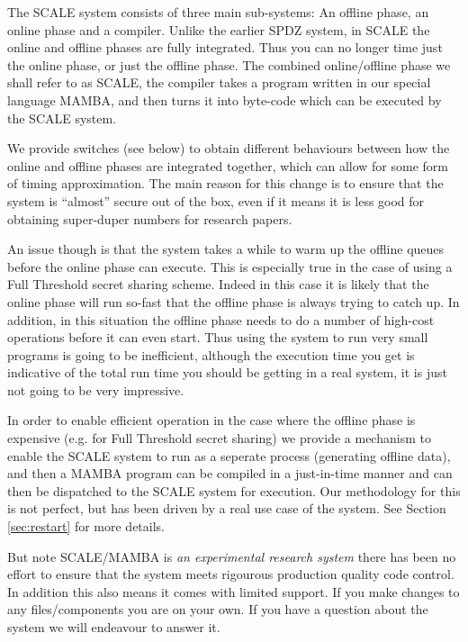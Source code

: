 

\label{sec:introduction}
The SCALE system consists of three main sub-systems:
An offline phase, an online phase and a compiler. 
Unlike the earlier SPDZ system, in SCALE the online
and offline phases are fully integrated. Thus you
can no longer time just the online phase, or just
the offline phase.
The combined online/offline phase we shall refer
to as SCALE, the compiler takes a program written
in our special language MAMBA, and then turns it
into byte-code which can be executed by the SCALE
system. 

We provide switches (see below) to obtain 
different behaviours between how the online and offline
phases are integrated together, which can allow for
some form of timing approximation.
The main reason for this change is to ensure that the
system is ``almost'' secure out of the box, even if it
means it is less good for obtaining super-duper numbers
for research papers.

An issue though is that the system takes a while to warm
up the offline queues before the online phase can execute.
This is especially true in the case of using a Full Threshold
secret sharing scheme. Indeed in this case it is likely
that the online phase will run so-fast that the offline
phase is always trying to catch up. In addition, in this
situation the offline phase needs to do a number of
high-cost operations before it can even start. Thus
using the system to run very small programs is going to
be inefficient, although the execution time you get
is indicative of the total run time you should be getting
in a real system, it is just not going to be very
impressive.

In order to enable efficient operation in the case where the
offline phase is expensive (e.g. for Full Threshold secret sharing)
we provide a mechanism to enable the SCALE system to run
as a seperate process (generating offline data), and then
a MAMBA program can be compiled in a just-in-time manner
and can then be dispatched to the SCALE system for
execution. Our methodology for this is not perfect, but has
been driven by a real use case of the system.
See Section \ref{sec:restart} for more details.

But note SCALE/MAMBA is {\em an experimental research system} 
there has been no effort to ensure that the system meets rigourous production
quality code control. 
In addition this also means it comes with limited support.
If you make changes to any files/components you are on your
own.
If you have a question about the system we will endeavour to
answer it.

